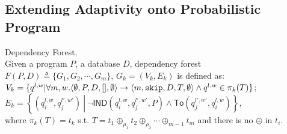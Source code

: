 \documentclass[a4paper,11pt]{article}
\begin{document}
%
\subsection{Extending Adaptivity onto Probabilistic Program}
%
\begin{defn}
Dependency Forest.
\\
Given a program $P$, a database $D$, 
dependency forest $F(P, D) \triangleq \{ G_1, G_2, \cdots, G_m \}$,
$G_k = (V_k, E_k)$ is defined as: 
\\
$V_k =\{q^{l,w} |\forall m, w. \langle \emptyset, P, D,[], \emptyset  \rangle \rightarrow \langle m, \mathtt{skip}, D, T, \emptyset \rangle \land q^{l,w} \in \pi_k (T)  \}$;
\\
$E_k = \left\{(q_i^{l,w},q_j^{l',w'}) 
~ \left \vert ~ \neg \mathsf{IND}(q_i^{l,w},q_j^{l',w'}, P)
\land \mathsf{To}(q_j^{l',w'}, q_i^{l,w}) \right.\right\}$,
\\
where $\pi_k (T) = t_k$ s.t. $T = t_1 \oplus_{\rho_1} t_2 \oplus_{\rho_2}
\cdots \oplus_{m - 1} t_m $ and there is no $\oplus$ in $t_i$.
\end{defn}
\end{document}
